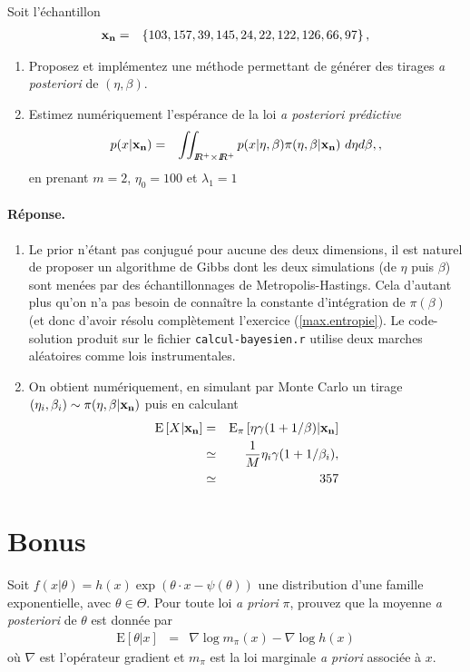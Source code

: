 \documentclass[10pt]{article}
\newcommand{\R}{I\!\!R}
\newcommand{\E}{\mbox{E}}
\newcommand{\1}{\mathbbm{1}}
\begin{document}
Soit l'échantillon
\begin{eqnarray*}
{\bf x_n} & = & \left\{ 103, 157 , 39 ,145 , 24  ,22 ,122, 126 , 66 , 97\right\},
\end{eqnarray*}
\begin{enumerate}
\item Proposez et implémentez une méthode permettant de générer des tirages {\it a posteriori} de $(\eta,\beta)$. 
\item Estimez numériquement l'espérance de la loi {\it a posteriori prédictive} 
\begin{eqnarray*}
p(x|{\bf x_n}) & = & \iint_{\R^+\times\R^+} p(x|\eta,\beta) \pi(\eta,\beta|{\bf x_n}) \ d\eta d\beta,,
\end{eqnarray*}
 en prenant $m=2$, $\eta_0=100$ et $\lambda_1=1$ 
\end{enumerate}

\paragraph{\bf Réponse.} 
\begin{enumerate}
\item Le prior n'étant pas conjugué pour aucune des deux dimensions, il est naturel de proposer un algorithme de Gibbs dont les deux simulations (de $\eta$ puis $\beta$) sont menées par des échantillonnages de Metropolis-Hastings. Cela d'autant plus qu'on n'a pas besoin de connaître la constante d'intégration de $\pi(\beta)$ (et donc d'avoir résolu complètement l'exercice (\ref{max.entropie}).  Le code-solution produit sur le fichier \texttt{calcul-bayesien.r} utilise deux marches aléatoires comme lois instrumentales. 
\item On obtient numériquement, en simulant par Monte Carlo un tirage $(\eta_i,\beta_i)\sim \pi(\eta,\beta|{\bf x_n})$ puis en calculant \begin{eqnarray*}
\E\left[X|{\bf x_n}\right] & = & \E_{\pi}\left[\eta\gamma(1+1/\beta)|{\bf x_n}\right] \\
& \simeq & \frac{1}{M} \eta_i\gamma(1+1/\beta_i), \\
&  \simeq & 357
\end{eqnarray*}
\end{enumerate}

\section{Bonus}

Soit $f(x|\theta) = h(x)\exp\left(\theta\cdot x - \psi(\theta)\right)$ une distribution d'une famille exponentielle, avec $\theta\in\Theta$. Pour toute loi {\it a priori} $\pi$, prouvez que la moyenne {\it a posteriori} de $\theta$ est donnée par
\begin{eqnarray*}
\E[\theta|x] & = & \nabla \log m_{\pi}(x) - \nabla \log h(x)
\end{eqnarray*}
où $\nabla$ est l'opérateur gradient et $m_{\pi}$ est la loi marginale {\it a priori} associée à $x$.
\end{document}
